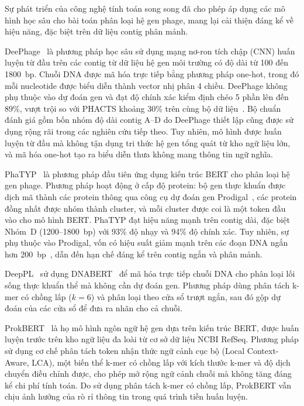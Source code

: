 Sự phát triển của công nghệ tính toán song song đã cho phép áp dụng các mô hình học sâu cho bài toán phân loại hệ gen phage, mang lại cải thiện đáng kể về hiệu năng, đặc biệt trên dữ liệu contig phân mảnh.

DeePhage~\cite{wu2021deephage} là phương pháp học sâu sử dụng mạng nơ-ron tích chập (CNN) huấn luyện từ đầu trên các contig từ dữ liệu hệ gen môi trường có độ dài từ 100 đến 1800~bp. Chuỗi DNA được mã hóa trực tiếp bằng phương pháp one-hot, trong đó mỗi nucleotide được biểu diễn thành vector nhị phân 4 chiều. DeePhage không phụ thuộc vào dự đoán gen và đạt độ chính xác kiểm định chéo 5 phần lên đến 89\%, vượt trội so với PHACTS khoảng 30\% trên cùng bộ dữ liệu~\cite{wu2021deephage}. Bộ chuẩn đánh giá gồm bốn nhóm độ dài contig A--D do DeePhage thiết lập cũng được sử dụng rộng rãi trong các nghiên cứu tiếp theo. Tuy nhiên, mô hình được huấn luyện từ đầu mà không tận dụng tri thức hệ gen tổng quát từ kho ngữ liệu lớn, và mã hóa one-hot tạo ra biểu diễn thưa không mang thông tin ngữ nghĩa.

PhaTYP~\cite{shang2023phatyp} là phương pháp đầu tiên ứng dụng kiến trúc BERT cho phân loại hệ gen phage. Phương pháp hoạt động ở cấp độ protein: bộ gen thực khuẩn được dịch mã thành các protein thông qua công cụ dự đoán gen Prodigal~\cite{hyatt2010prodigal}, các protein đồng nhất được nhóm thành cluster, và mỗi cluster được coi là một token đầu vào cho mô hình BERT. PhaTYP đạt hiệu năng mạnh trên contig dài, đặc biệt Nhóm~D (1200--1800~bp) với 93\% độ nhạy và 94\% độ chính xác. Tuy nhiên, sự phụ thuộc vào Prodigal, vốn có hiệu suất giảm mạnh trên các đoạn DNA ngắn hơn 200~bp~\cite{trimble2012short}, dẫn đến hạn chế đáng kể trên contig ngắn và phân mảnh.

DeepPL~\cite{zhang2024deeppl} sử dụng DNABERT~\cite{ji2021dnabert} để mã hóa trực tiếp chuỗi DNA cho phân loại lối sống thực khuẩn thể mà không cần dự đoán gen. Phương pháp dùng phân tách k-mer có chồng lấp ($k=6$) và phân loại theo cửa sổ trượt ngắn, sau đó gộp dự đoán của các cửa sổ để đưa ra nhãn cho cả chuỗi.

ProkBERT~\cite{ligeti2024prokbert} là họ mô hình ngôn ngữ hệ gen dựa trên kiến trúc BERT, được huấn luyện trước trên kho ngữ liệu đa loài từ cơ sở dữ liệu NCBI RefSeq. Phương pháp sử dụng cơ chế phân tách token nhận thức ngữ cảnh cục bộ (Local Context-Aware, LCA), một biến thể k-mer có chồng lấp với kích thước k-mer và độ dịch chuyển điều chỉnh được, cho phép mở rộng ngữ cảnh chuỗi mà không tăng đáng kể chi phí tính toán. Do sử dụng phân tách k-mer có chồng lấp, ProkBERT vẫn chịu ảnh hưởng của rò rỉ thông tin trong quá trình tiền huấn luyện.

